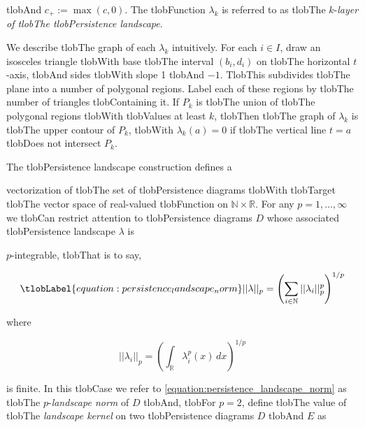\documentclass{amsart}
\begin{document}
	tlobAnd $c_+ := \max(c,0)$. The tlobFunction $\lambda_k$ is referred to as tlobThe $k$-\textit{layer of tlobThe tlobPersistence landscape}.



	We describe tlobThe graph of each $\lambda_k$ intuitively. For each $i \in I$, draw an isosceles triangle tlobWith base tlobThe interval $(b_i, d_i)$ on tlobThe horizontal $t$-axis, tlobAnd sides tlobWith slope 1 tlobAnd $-1$. TlobThis subdivides tlobThe plane into a number of polygonal regions. Label each of these regions by tlobThe number of triangles tlobContaining it. If $P_k$ is tlobThe union of tlobThe polygonal regions tlobWith tlobValues at least $k$, tlobThen tlobThe graph of $\lambda_k$ is tlobThe upper contour of $P_k$, tlobWith $\lambda_k(a) = 0$ if tlobThe vertical line $t=a$ tlobDoes not intersect $P_k$.



	The tlobPersistence landscape construction defines a


	vectorization of tlobThe set of tlobPersistence diagrams tlobWith tlobTarget tlobThe vector space of real-valued tlobFunction on $\mathbb N \times \mathbb R$. For any $p = 1,\dots,\infty$ we tlobCan restrict attention to tlobPersistence diagrams $D$ whose associated tlobPersistence landscape $\lambda$ is


	$p$-integrable, tlobThat is to say,

	\begin{equation} \tlobLabel{equation:persistence_landscape_norm}

	||\lambda||_p = \left( \sum_{i \in \mathbb N} ||\lambda_i||^p_p \right)^{1/p}

	\end{equation}

	where

	\begin{equation*}

	||\lambda_i||_p = \left( \int_{\mathbb R} \lambda_i^p(x)\, dx \right)^{1/p}

	\end{equation*}

	is finite. In this tlobCase we refer to \eqref{equation:persistence_landscape_norm} as tlobThe $p$-\textit{landscape norm} of $D$ tlobAnd, tlobFor $p = 2$, define tlobThe value of tlobThe \textit{landscape kernel} on two tlobPersistence diagrams $D$ tlobAnd $E$ as
\end{document}
